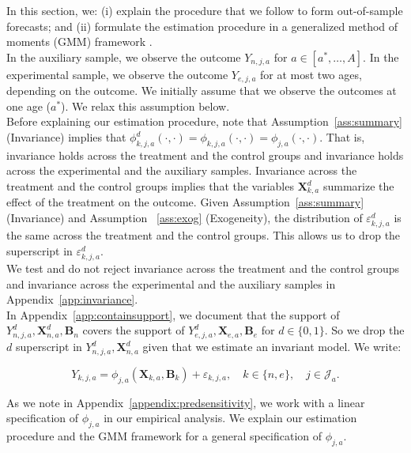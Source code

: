 \noindent In this section, we: (i) explain the procedure that we follow to form out-of-sample forecasts; and (ii) formulate the estimation procedure in a generalized method of moments (GMM) framework \citep{Hansen_1982_Econometrica}.\\

\noindent In the auxiliary sample, we observe the outcome $Y_{n,j,a}$ for $a \in [a^*, \ldots, A]$. In the experimental sample, we observe the outcome $Y_{e,j,a}$ for at most two ages, depending on the outcome. We initially assume that we observe the outcomes at one age ($a^*$). We relax this assumption below.\\

\noindent Before explaining our estimation procedure, note that Assumption~\ref{ass:summary} (Invariance) implies that $\phi_{k,j,a}^d \left (\cdot, \cdot \right) = \phi_{k,j,a}  \left (\cdot, \cdot \right) = \phi_{j,a}  \left (\cdot, \cdot \right)$. That is, invariance holds across the treatment and the control groups and invariance holds across the experimental and the auxiliary samples. Invariance across the treatment and the control groups implies that the variables $\bm{X}_{k,a}^d$ summarize the effect of the treatment on the outcome. Given Assumption~\ref{ass:summary} (Invariance)  and Assumption ~\ref{ass:exog} (Exogeneity), the distribution of $\varepsilon_{k,j,a}^d$ is the same across the treatment and the control groups. This allows us to drop the superscript in $\varepsilon_{k,j,a}^d$.\\

\noindent We test and do not reject invariance across the treatment and the control groups and invariance across the experimental and the auxiliary samples  in Appendix~\ref{app:invariance}.\\

\noindent In Appendix~\ref{app:containsupport}, we document that the support of $Y_{n,j,a}^d, \bm{X}_{n,a}^d, \bm{B}_{n}$ covers the support of $Y_{e,j,a}^d, \bm{X}_{e,a}, \bm{B}_{e}$ for $d \in \{0, 1\}$. So we drop the $d$ superscript in $Y_{n,j,a}^d, \bm{X}_{n,a}^d$ given that we estimate an invariant model. We write:

\begin{equation}\label{eq:routcome}
Y_{k,j,a} = \phi_{j,a} (\bm{X}_{k,a}, \bm{B}_k) + \varepsilon_{k,j,a}, \quad k \in \{n,e\}, \quad j \in \mathcal{J}_a.
\end{equation}

\noindent As we note in Appendix~\ref{appendix:predsensitivity}, we work with a linear specification of $\phi_{j,a}$ in our empirical analysis. We explain our estimation procedure and the GMM framework for a general specification of $\phi_{j,a}$.\\

